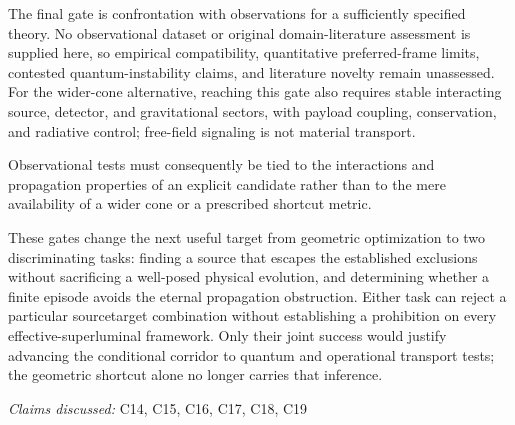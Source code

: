 \documentclass[11pt]{article}
\begin{document}
The final gate is confrontation with observations for a sufficiently specified theory. No observational dataset or original domain-literature assessment is supplied here, so empirical compatibility, quantitative preferred-frame limits, contested quantum-instability claims, and literature novelty remain unassessed. For the wider-cone alternative, reaching this gate also requires stable interacting source, detector, and gravitational sectors, with payload coupling, conservation, and radiative control; free-field signaling is not material transport.

Observational tests must consequently be tied to the interactions and propagation properties of an explicit candidate rather than to the mere availability of a wider cone or a prescribed shortcut metric.

These gates change the next useful target from geometric optimization to two discriminating tasks: finding a source that escapes the established exclusions without sacrificing a well-posed physical evolution, and determining whether a finite episode avoids the eternal propagation obstruction. Either task can reject a particular source\textendash{}target combination without establishing a prohibition on every effective-superluminal framework. Only their joint success would justify advancing the conditional corridor to quantum and operational transport tests; the geometric shortcut alone no longer carries that inference.

\textit{Claims discussed: }C14, C15, C16, C17, C18, C19
\end{document}
